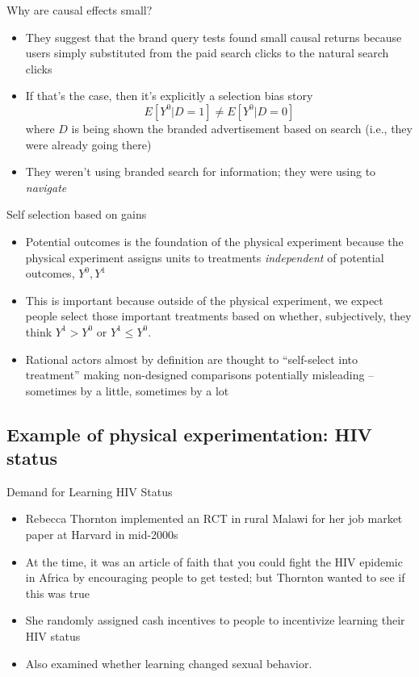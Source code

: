 \documentclass{beamer}
\begin{document}
\begin{frame}{Why are causal effects small?}

\begin{itemize}
\item They suggest that the brand query tests found small causal returns because users simply substituted from the paid search clicks to the natural search clicks
\item If that's the case, then it's explicitly a selection bias story $$E[Y^0|D=1] \neq E[Y^0|D=0]$$ where $D$ is being shown the branded advertisement based on search (i.e., they were already going there)
\item They weren't using branded search for information; they were using to \emph{navigate}
\end{itemize}

\end{frame}

\begin{frame}{Self selection based on gains}

\begin{itemize}
\item Potential outcomes is the foundation of the physical experiment because the physical experiment assigns units to treatments \emph{independent} of potential outcomes, $Y^0,Y^1$
\item This is important because outside of the physical experiment, we expect people select those important treatments based on whether, subjectively, they think $Y^1>Y^0$ or $Y^1\leq Y^0$. 
\item Rational actors almost by definition are thought to ``self-select into treatment'' making non-designed comparisons potentially misleading -- sometimes by a little, sometimes by a lot
\end{itemize}

\end{frame}





\subsection{Example of physical experimentation: HIV status}

\begin{frame}{Demand for Learning HIV Status}


  \begin{itemize}
    \item Rebecca Thornton implemented an RCT in rural Malawi for her job market paper at Harvard in mid-2000s
    \item At the time, it was an article of faith that you could fight the HIV epidemic in Africa by encouraging people to get tested; but Thornton wanted to see if this was true
    \item She randomly assigned cash incentives to people to incentivize learning their HIV status
    \item Also examined whether learning changed sexual behavior.
  \end{itemize}

\end{frame}
\end{document}
